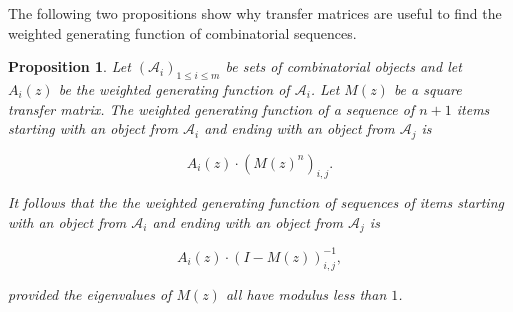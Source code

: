 \documentclass{article}
\newtheorem{proposition}{Proposition}
\begin{document}
The following two propositions show why transfer matrices are useful to
find the weighted generating function of combinatorial sequences.

\begin{proposition}
\label{th:transfermatrices}
Let $(\mathcal{A}_i)_{1 \leq i \leq m}$ be sets of combinatorial objects
and let $A_i(z)$ be the weighted generating function of $\mathcal{A}_i$.
Let $M(z)$ be a square transfer matrix. The weighted generating function
of a sequence of $n+1$ items starting with an object from $\mathcal{A}_i$
and ending with an object from $\mathcal{A}_j$ is

\begin{equation}
\label{eq:mznij}
A_i(z) \cdot \left( M(z)^n \right)_{i,j}.
\end{equation}

It follows that the the weighted generating function of sequences of items
starting with an object from $\mathcal{A}_i$ and ending with an object
from $\mathcal{A}_j$ is

\begin{equation}
\label{eq:I-Mz}
A_i(z) \cdot \left( I - M(z) \right)^{-1}_{i,j},
\end{equation}

\noindent
provided the eigenvalues of $M(z)$ all have modulus less than $1$.
\end{proposition}
\end{document}
